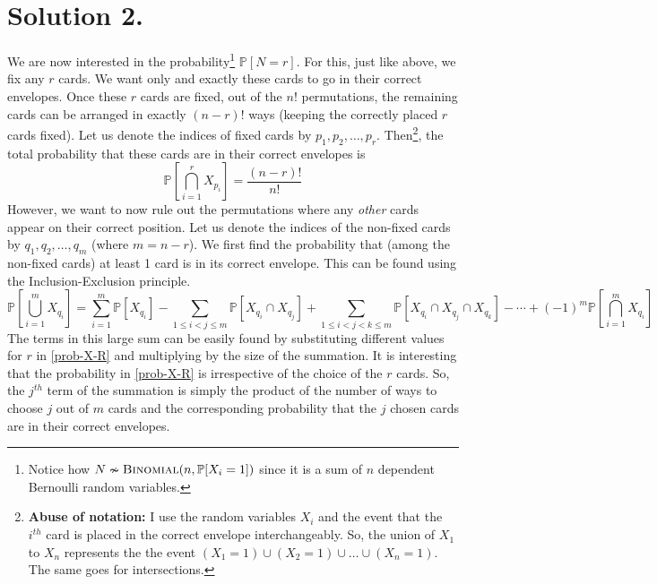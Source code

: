 \documentclass[9pt]{article}
\begin{document}
\section*{\textbf{Solution 2.}}
We are now interested in the probability\footnote{Notice how $N \nsim \textsc{Binomial}(n, \mathbb{P}[X_{i} = 1])$
since it is a sum of $n$ dependent Bernoulli random variables.} $\mathbb{P}[N = r]$. For this, just
like above, we fix any $r$ cards. We want only and exactly these cards to go in their correct envelopes.
Once these $r$ cards are fixed, out of the $n!$ permutations, the remaining cards can be arranged
in exactly $(n-r)!$ ways (keeping the correctly placed $r$ cards fixed). Let us denote the indices of
fixed cards by $p_{1}, p_{2}, \dots, p_{r}$. Then\footnote{\textbf{Abuse of notation:} I use the random
variables $X_{i}$ and the event that the $i^{th}$ card is placed in the correct envelope interchangeably.
So, the union of $X_{1}$ to $X_{n}$ represents the the event $(X_{1} = 1) \cup (X_{2} = 1) \cup \dots \cup (X_{n} = 1)$.
The same goes for intersections.}, the total probability that these cards are in their correct envelopes is
\begin{equation}
    \label{prob-X-R}
    \mathbb{P}\left[ \bigcap_{i = 1}^{r} X_{p_{i}} \right] = \frac{(n-r)!}{n!}
\end{equation}
However, we want to now rule out the permutations where any \textit{other} cards appear on their correct position.
Let us denote the indices of the non-fixed cards by $q_{1}, q_{2}, \dots, q_{m}$ (where $m = n-r$).
We first find the probability that (among the non-fixed cards) at least 1 card is in its correct envelope.
This can be found using the Inclusion-Exclusion principle.
\begin{equation}
    \label{incl-excl}
    \mathbb{P}\left[ \bigcup_{i=1}^{m} X_{q_{i}} \right] = \sum_{i=1}^{m} \mathbb{P}[X_{q_{i}}] - \sum_{1 \leq i < j \leq m}
    \mathbb{P}[X_{q_{i}} \cap X_{q_{j}}] + \sum_{1 \leq i < j < k \leq m} \mathbb{P}[X_{q_{i}} \cap X_{q_{j}} \cap X_{q_{k}}] - \cdots
    + (-1)^{m} \mathbb{P}\left[ \bigcap_{i=1}^{m} X_{q_{i}} \right]
\end{equation}
The terms in this large sum can be easily found by substituting different values for $r$ in \eqref{prob-X-R} and
multiplying by the size of the summation. It is interesting that the probability in \eqref{prob-X-R} is irrespective of
the choice of the $r$ cards. So, the $j^{th}$ term of the summation is simply the product of the number of ways to choose
$j$ out of $m$ cards and the corresponding probability that the $j$ chosen cards are in their correct envelopes. \\
\end{document}

